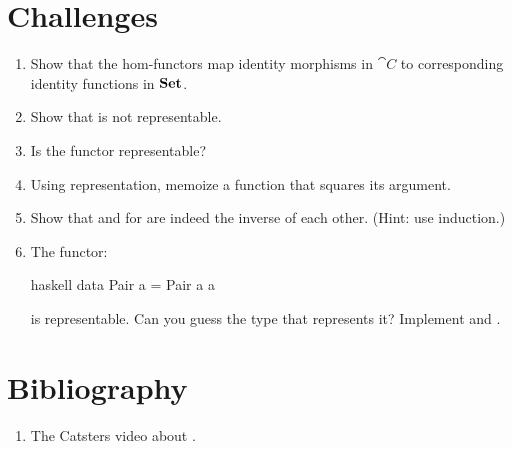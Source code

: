 \section{Challenges}

\begin{enumerate}
  \tightlist
  \item
        Show that the hom-functors map identity morphisms in $\cat{C}$ to
        corresponding identity functions in $\mathbf{Set}$.
  \item
        Show that  is not representable.
  \item
        Is the  functor representable?
  \item
        Using  representation, memoize a function that squares
        its argument.
  \item
        Show that  and  for  are
        indeed the inverse of each other. (Hint: use induction.)
  \item
        The functor:

        \begin{snip}{haskell}
data Pair a = Pair a a
\end{snip}
        is representable. Can you guess the type that represents it? Implement
         and .
\end{enumerate}

\section{Bibliography}

\begin{enumerate}
  \tightlist
  \item
        The Catsters video about
        .
\end{enumerate}
